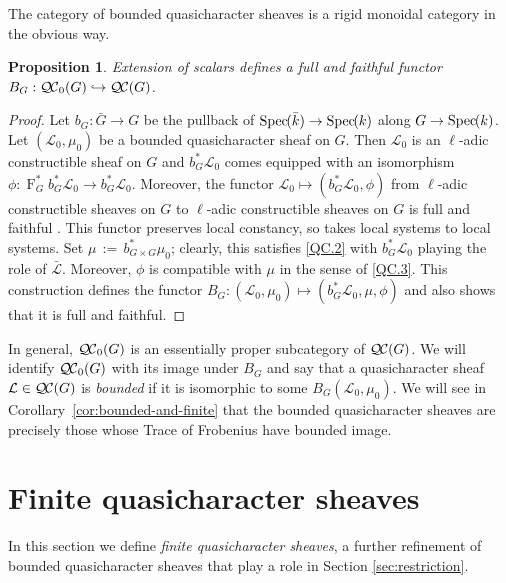 \documentclass{amsart}
\theoremstyle{plain}
\newtheorem{proposition}[theorem]{Proposition}
\theoremstyle{definition}
\theoremstyle{remark}
\newcommand{\bFq}{\bar{k}}
\newcommand{\Fq}{k}
\newcommand{\Frob}[1]{\operatorname{F}_{#1}}
\newcommand{\Spec}[1]{{\operatorname{Spec}\hskip-1pt( #1 )}}
\newcommand{\ceq}{{\, :=\, }}
\newcommand{\qcs}[1]{{\mathcal{#1}}}
\newcommand{\gqcs}[1]{{\mathcal{\bar #1}}}
\newcommand{\QC}{{\mathcal{Q\hskip-0.8pt C}}}
\newcommand{\QCb}{{\QC_0}}
\begin{document}
The category of bounded quasicharacter sheaves is a rigid monoidal category in the obvious way.

\begin{proposition}\label{prop:BG}
Extension of scalars defines a full and faithful functor
$B_G : \QCb(G) \hookrightarrow \QC(G)$.
\end{proposition}

\begin{proof}
 Let $b_G : {\bar G} \to G$ be the pullback of $\Spec{\bFq} \to \Spec{\Fq}$ along $G\to \Spec{\Fq}$.
 Let $(\qcs{L}_0,\mu_0)$ be a bounded quasicharacter sheaf on $G$.
 Then $\qcs{L}_0$ is an $\ell$-adic constructible sheaf on $G$ and
 $b_G^* \qcs{L}_0$ comes equipped with an isomorphism
 $\phi : \Frob{G}^* b_G^*\qcs{L}_0 \to b_G^* \qcs{L}_0$.
 Moreover, the functor $\qcs{L}_0 \mapsto (b_G^* \qcs{L}_0,\phi)$
 from $\ell$-adic constructible sheaves on $G$ to $\ell$-adic constructible sheaves on $G$
 is full and faithful .
 This functor preserves local constancy, so takes local systems to local systems.
 Set $\mu \ceq b_{G\times G}^*\mu_0$; clearly, this satisfies \ref{QC.2}
 with $b_G^*\qcs{L}_0$ playing the role of $\gqcs{L}$.
 Moreover, $\phi$ is compatible with $\mu$ in the sense of \ref{QC.3}.
 This construction defines the functor $B_G : (\qcs{L}_0,\mu_0) \mapsto (b_G^*\qcs{L}_0,\mu, \phi)$
 and also shows that it is full and faithful.
\end{proof}

In general, $\QCb(G)$ is an essentially
proper subcategory of $\QC(G)$. We will identify $\QCb(G)$ with its image under $B_G$
and say that a quasicharacter sheaf $\qcs{L} \in \QC(G)$ is \emph{bounded}
if it is isomorphic to some $B_G(\qcs{L}_0, \mu_0)$.
We will see in Corollary~\ref{cor:bounded-and-finite} that the bounded quasicharacter sheaves
are precisely those whose Trace of Frobenius have bounded image.

\section{Finite quasicharacter sheaves}\label{sec:finite}

In this section we define \emph{finite quasicharacter sheaves}, a further refinement
of bounded quasicharacter sheaves that play a role in Section \ref{sec:restriction}.
\end{document}
